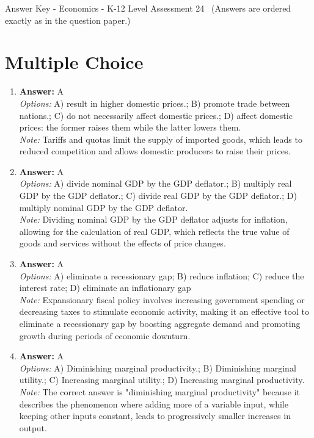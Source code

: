 \documentclass[12pt]{article}
\begin{document}
\begin{center}
Answer Key - Economics - K-12 Level Assessment 24 \
\small (Answers are ordered exactly as in the question paper.)
\end{center}

\section*{Multiple Choice}
\begin{enumerate}[label=\arabic*.]
\item \textbf{Answer:} A
\\ \textit{Options:} A) result in higher domestic prices.; B) promote trade between nations.; C) do not necessarily affect domestic prices.; D) affect domestic prices: the former raises them while the latter lowers them.
\\ \textit{Note:} Tariffs and quotas limit the supply of imported goods, which leads to reduced competition and allows domestic producers to raise their prices.
\item \textbf{Answer:} A
\\ \textit{Options:} A) divide nominal GDP by the GDP deflator.; B) multiply real GDP by the GDP deflator.; C) divide real GDP by the GDP deflator.; D) multiply nominal GDP by the GDP deflator.
\\ \textit{Note:} Dividing nominal GDP by the GDP deflator adjusts for inflation, allowing for the calculation of real GDP, which reflects the true value of goods and services without the effects of price changes.
\item \textbf{Answer:} A
\\ \textit{Options:} A) eliminate a recessionary gap; B) reduce inflation; C) reduce the interest rate; D) eliminate an inflationary gap
\\ \textit{Note:} Expansionary fiscal policy involves increasing government spending or decreasing taxes to stimulate economic activity, making it an effective tool to eliminate a recessionary gap by boosting aggregate demand and promoting growth during periods of economic downturn.
\item \textbf{Answer:} A
\\ \textit{Options:} A) Diminishing marginal productivity.; B) Diminishing marginal utility.; C) Increasing marginal utility.; D) Increasing marginal productivity.
\\ \textit{Note:} The correct answer is "diminishing marginal productivity" because it describes the phenomenon where adding more of a variable input, while keeping other inputs constant, leads to progressively smaller increases in output.

\end{enumerate}
\end{document}
